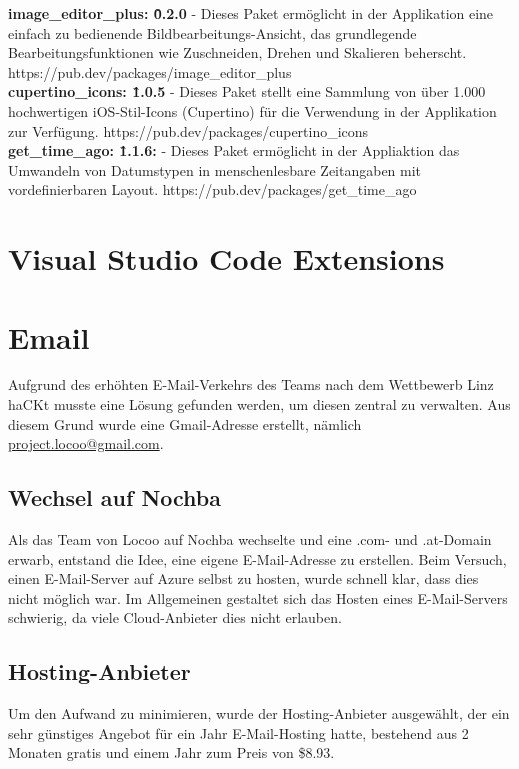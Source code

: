 \textbf{image\_editor\_plus: \^0.2.0} - Dieses Paket ermöglicht in der Applikation eine einfach zu bedienende Bildbearbeitungs-Ansicht, das grundlegende Bearbeitungsfunktionen wie Zuschneiden, Drehen und Skalieren beherscht.
https://pub.dev/packages/image\_editor\_plus
\\
\textbf{cupertino\_icons: \^1.0.5} - Dieses Paket stellt eine Sammlung von über 1.000 hochwertigen iOS-Stil-Icons (Cupertino) für die Verwendung in der Applikation zur Verfügung.
https://pub.dev/packages/cupertino\_icons
\\
\textbf{get\_time\_ago: \^1.1.6:} - Dieses Paket ermöglicht in der Appliaktion das Umwandeln von Datumstypen in menschenlesbare Zeitangaben mit vordefinierbaren Layout.
https://pub.dev/packages/get\_time\_ago


\section{Visual Studio Code Extensions}




\section{Email}
Aufgrund des erhöhten E-Mail-Verkehrs des Teams nach dem Wettbewerb Linz haCKt musste eine Lösung gefunden werden, um diesen zentral zu verwalten. Aus diesem Grund wurde eine Gmail-Adresse erstellt, nämlich \href{mailto:project.locoo@gmail.com}{project.locoo@gmail.com}.

\subsection{Wechsel auf Nochba}
Als das Team von Locoo auf Nochba wechselte und eine .com- und .at-Domain erwarb, entstand die Idee, eine eigene E-Mail-Adresse zu erstellen. Beim Versuch, einen E-Mail-Server auf Azure selbst zu hosten, wurde schnell klar, dass dies nicht möglich war. Im Allgemeinen gestaltet sich das Hosten eines E-Mail-Servers schwierig, da viele Cloud-Anbieter dies nicht erlauben.

\subsection{Hosting-Anbieter}
Um den Aufwand zu minimieren, wurde der Hosting-Anbieter \cite{namecheap} ausgewählt, der ein sehr günstiges Angebot für ein Jahr E-Mail-Hosting hatte, bestehend aus 2 Monaten gratis und einem Jahr zum Preis von \$8.93.

